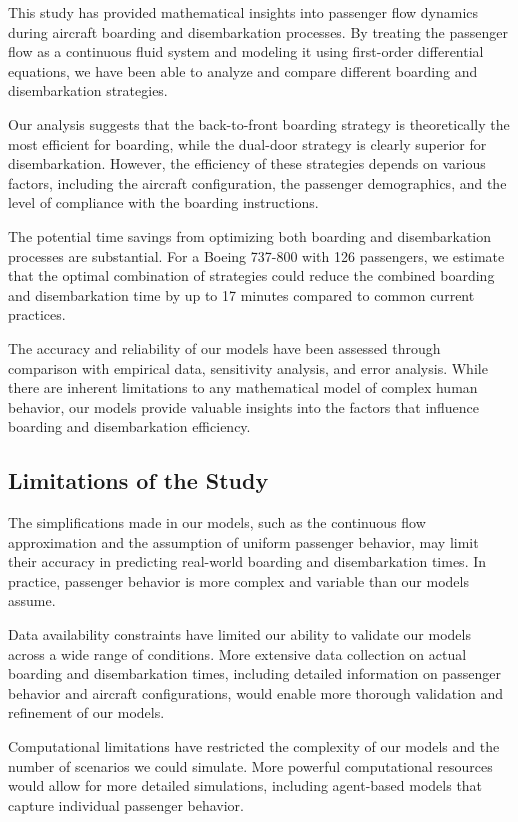 \documentclass[12pt,a4paper]{article}
\begin{document}
This study has provided mathematical insights into passenger flow dynamics during aircraft boarding and disembarkation processes. By treating the passenger flow as a continuous fluid system and modeling it using first-order differential equations, we have been able to analyze and compare different boarding and disembarkation strategies.

Our analysis suggests that the back-to-front boarding strategy is theoretically the most efficient for boarding, while the dual-door strategy is clearly superior for disembarkation. However, the efficiency of these strategies depends on various factors, including the aircraft configuration, the passenger demographics, and the level of compliance with the boarding instructions.

The potential time savings from optimizing both boarding and disembarkation processes are substantial. For a Boeing 737-800 with 126 passengers, we estimate that the optimal combination of strategies could reduce the combined boarding and disembarkation time by up to 17 minutes compared to common current practices.

The accuracy and reliability of our models have been assessed through comparison with empirical data, sensitivity analysis, and error analysis. While there are inherent limitations to any mathematical model of complex human behavior, our models provide valuable insights into the factors that influence boarding and disembarkation efficiency.

\subsection{Limitations of the Study}

The simplifications made in our models, such as the continuous flow approximation and the assumption of uniform passenger behavior, may limit their accuracy in predicting real-world boarding and disembarkation times. In practice, passenger behavior is more complex and variable than our models assume.

Data availability constraints have limited our ability to validate our models across a wide range of conditions. More extensive data collection on actual boarding and disembarkation times, including detailed information on passenger behavior and aircraft configurations, would enable more thorough validation and refinement of our models.

Computational limitations have restricted the complexity of our models and the number of scenarios we could simulate. More powerful computational resources would allow for more detailed simulations, including agent-based models that capture individual passenger behavior.
\end{document}
